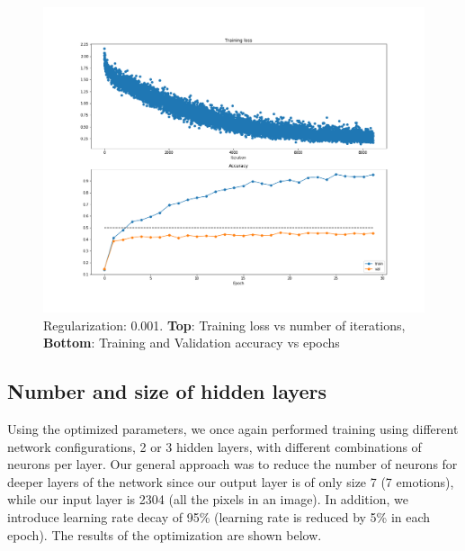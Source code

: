 \documentclass[12pt,twoside]{article}
\begin{document}
\begin{figure}[!htbp]
\centering %
\includegraphics[width = 0.8\hsize]{./figures/reg_0_001.png} %
\caption{Regularization: 0.001. \textbf{Top}: Training loss vs number of iterations, \textbf{Bottom}: Training and Validation accuracy vs epochs} %
\label{reg0_001}
\end{figure}

\subsection{Number and size of hidden layers}

Using the optimized parameters, we once again performed training using different network configurations, 2 or 3 hidden layers,  with different combinations of neurons per layer. Our general approach was to reduce the number of neurons for deeper layers of the network since our output layer is of only size 7 (7 emotions), while our input layer is 2304 (all the pixels in an image). In addition, we introduce learning rate decay of 95\% (learning rate is reduced by 5\% in each epoch). The results of the optimization are shown below.
\end{document}
